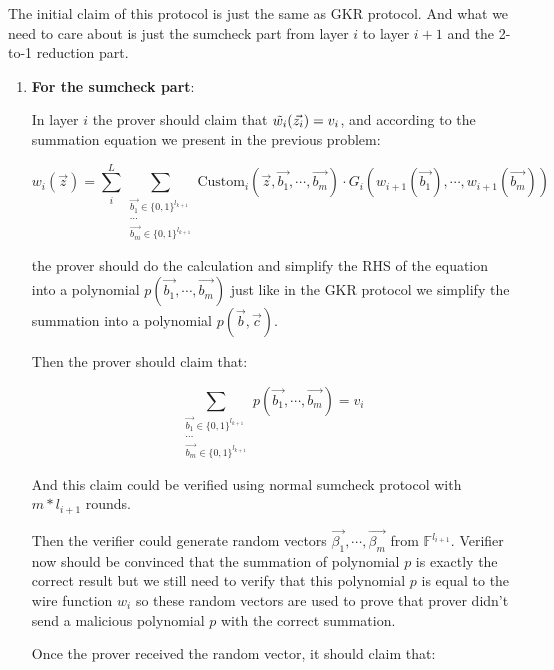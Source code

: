 \documentclass[12pt]{article}
\newenvironment{sol}[1][Solution]{\begin{trivlist}
\item[\hskip \labelsep {\bfseries #1:}]}{\end{trivlist}}
\begin{document}
\begin{sol}
    The initial claim of this protocol is just the same as GKR protocol. And what we need to care about is just the sumcheck part from layer $i$ to layer $i+1$ and the 2-to-1 reduction part.



    \begin{enumerate}
        \item \textbf{For the sumcheck part}:

              In layer $i$ the prover should claim that $\Tilde{w_i}(\vec{z_i}) = v_i$, and according to the summation equation we present in the previous problem:

              $$
                  w_i(\vec{z}) = \sum_i^{L} \sum_{\substack{\vec{b_1} \in \{0,1\}^{l_{k+1}}\\
                  \cdots\\
                  \vec{b_m} \in \{0,1\}^{l_{k+1}}}}
                  \text{Custom}_i(\vec{z}, \vec{b_1}, \cdots, \vec{b_m}) \cdot G_i(w_{i+1}(\vec{b_1}), \cdots, w_{i+1}(\vec{b_m}))
              $$

              the prover should do the calculation and simplify the RHS of the equation into a polynomial $p(\vec{b_1}, \cdots, \vec{b_m})$ just like in the GKR protocol we simplify the summation into a polynomial $p(\vec{b}, \vec{c})$.

              Then the prover should claim that:

              $$
                  \sum_{\substack{\vec{b_1} \in \{0,1\}^{l_{k+1}}\\
                  \cdots\\
                  \vec{b_m} \in \{0,1\}^{l_{k+1}}}}
                  p(\vec{b_1}, \cdots, \vec{b_m}) = v_i
              $$

              And this claim could be verified using normal sumcheck protocol with $m * l_{i+1}$ rounds.

              Then the verifier could generate random vectors $\vec{\beta_1}, \cdots, \vec{\beta_m}$ from $\mathbb{F}^{l_{i+1}}$. Verifier now should be convinced that the summation of polynomial $p$ is exactly the correct result but we still need to verify that this polynomial $p$ is equal to the wire function $w_i$ so these random vectors are used to prove that prover didn't send a malicious polynomial $p$ with the correct summation.

              Once the prover received the random vector, it should claim that:


\end{enumerate}
\end{sol}
\end{document}
